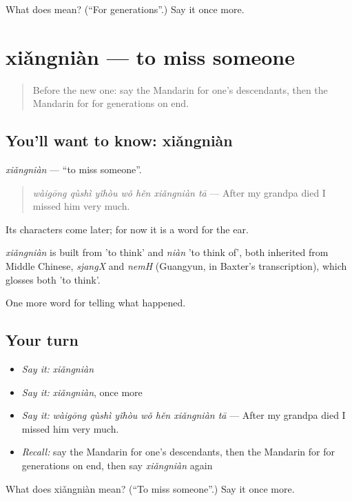 \begin{tcolorbox}[breakable,colback=teal!4,colframe=teal!35!black,title={Before you move on}]
What does  mean? (\textquotedblleft{}For generations\textquotedblright{}.) Say it once more.
\end{tcolorbox}
\section[xiǎngniàn]{xiǎngniàn — to miss someone}

\label{lesson:ZH-C325-xiangnian}



\begin{quote}
Before the new one: say the Mandarin for one's descendants, then the Mandarin for for generations on end.
\end{quote}

\subsection*{You'll want to know: xiǎngniàn}
\emph{xiǎngniàn} — \textquotedblleft{}to miss someone\textquotedblright{}.

\begin{quote}
\emph{wàigōng qùshì yǐhòu wǒ hěn xiǎngniàn tā} — After my grandpa died I missed him very much.
\end{quote}

Its characters come later; for now it is a word for the ear.

\begin{cousinweb}
\emph{xiǎngniàn} is built from  'to think' and \emph{niàn} 'to think of', both inherited from Middle Chinese, \emph{sjangX} and \emph{nemH} (Guangyun, in Baxter's transcription), which glosses both 'to think'.
\end{cousinweb}

\begin{grammarlens}[title={What you've built}]
One more word for telling what happened.
\end{grammarlens}

\subsection*{Your turn}
\begin{itemize}
\raggedright
  \item \emph{Say it:} \emph{xiǎngniàn}
  \item \emph{Say it:} \emph{xiǎngniàn}, once more
  \item \emph{Say it:} \emph{wàigōng qùshì yǐhòu wǒ hěn xiǎngniàn tā} — After my grandpa died I missed him very much.
  \item \emph{Recall:} say the Mandarin for one's descendants, then the Mandarin for for generations on end, then say \emph{xiǎngniàn} again
\end{itemize}

\begin{tcolorbox}[breakable,colback=teal!4,colframe=teal!35!black,title={Before you move on}]
What does xiǎngniàn mean? (\textquotedblleft{}To miss someone\textquotedblright{}.) Say it once more.
\end{tcolorbox}
